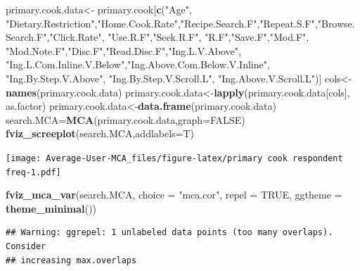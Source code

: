 \documentclass[
]{article}
\newenvironment{Shaded}{\begin{snugshade}}{\end{snugshade}}
\newcommand{\DataTypeTok}[1]{\textcolor[rgb]{0.13,0.29,0.53}{#1}}
\newcommand{\KeywordTok}[1]{\textcolor[rgb]{0.13,0.29,0.53}{\textbf{#1}}}
\newcommand{\NormalTok}[1]{#1}
\newcommand{\OtherTok}[1]{\textcolor[rgb]{0.56,0.35,0.01}{#1}}
\newcommand{\StringTok}[1]{\textcolor[rgb]{0.31,0.60,0.02}{#1}}
\begin{document}
\begin{Shaded}
\begin{Highlighting}[]
\NormalTok{primary.cook.data<-}\StringTok{ }\NormalTok{primary.cook[}\KeywordTok{c}\NormalTok{(}\StringTok{"Age"}\NormalTok{, }\StringTok{"Dietary.Restriction"}\NormalTok{,}\StringTok{"Home.Cook.Rate"}\NormalTok{,}\StringTok{"Recipe.Search.F"}\NormalTok{,}\StringTok{"Repeat.S.F"}\NormalTok{,}\StringTok{"Browse.Search.F"}\NormalTok{,}\StringTok{"Click.Rate"}\NormalTok{,}
            \StringTok{"Use.R.F"}\NormalTok{,}\StringTok{"Seek.R.F"}\NormalTok{, }\StringTok{"R.F"}\NormalTok{,}\StringTok{"Save.F"}\NormalTok{,}\StringTok{"Mod.F"}\NormalTok{, }\StringTok{"Mod.Note.F"}\NormalTok{,}\StringTok{"Disc.F"}\NormalTok{,}\StringTok{"Read.Disc.F"}\NormalTok{,}\StringTok{"Ing.L.V.Above"}\NormalTok{,}
            \StringTok{"Ing.L.Com.Inline.V.Below"}\NormalTok{,}\StringTok{"Ing.Above.Com.Below.V.Inline"}\NormalTok{,  }\StringTok{"Ing.By.Step.V.Above"}\NormalTok{,  }\StringTok{"Ing.By.Step.V.Scroll.L"}\NormalTok{,}
            \StringTok{"Ing.Above.V.Scroll.L"}\NormalTok{)]}
\NormalTok{cols<-}\KeywordTok{names}\NormalTok{(primary.cook.data)}
\NormalTok{primary.cook.data<-}\KeywordTok{lapply}\NormalTok{(primary.cook.data[cols], as.factor)}
\NormalTok{primary.cook.data<-}\KeywordTok{data.frame}\NormalTok{(primary.cook.data)}
\NormalTok{search.MCA=}\KeywordTok{MCA}\NormalTok{(primary.cook.data,}\DataTypeTok{graph=}\OtherTok{FALSE}\NormalTok{)}
\KeywordTok{fviz_screeplot}\NormalTok{(search.MCA,}\DataTypeTok{addlabels=}\NormalTok{T)}
\end{Highlighting}
\end{Shaded}

\texttt{[image: Average-User-MCA\_files/figure-latex/primary cook respondent freq-1.pdf]}

\begin{Shaded}
\begin{Highlighting}[]
\KeywordTok{fviz_mca_var}\NormalTok{(search.MCA, }\DataTypeTok{choice =} \StringTok{"mca.cor"}\NormalTok{, }\DataTypeTok{repel =} \OtherTok{TRUE}\NormalTok{,}
             \DataTypeTok{ggtheme =} \KeywordTok{theme_minimal}\NormalTok{())}
\end{Highlighting}
\end{Shaded}

\begin{verbatim}
## Warning: ggrepel: 1 unlabeled data points (too many overlaps). Consider
## increasing max.overlaps
\end{verbatim}
\end{document}
